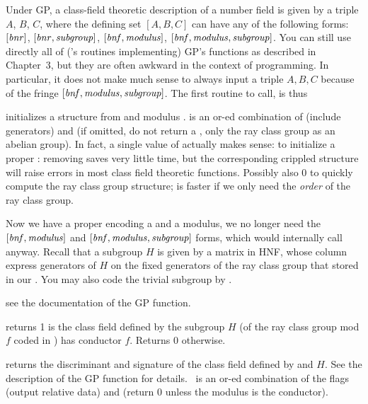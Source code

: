
Under GP, a class-field theoretic description of a number field is given by a
triple $A$, $B$, $C$, where the defining set $[A,B,C]$ can have any of the
following forms: $[\hbox{\it bnr\/}]$, $[\hbox{\it bnr\/},\hbox{\it subgroup\/}]$,
$[\hbox{\it bnf\/},\hbox{\it modulus\/}]$, $[\hbox{\it bnf\/},\hbox{\it modulus\/},\hbox{\it subgroup\/}]$.
You can still use directly all of ('s routines implementing) GP's
functions as described in Chapter~3, but they are often awkward in the context
of  programming. In particular, it does not make much sense to
always input a triple $A,B,C$ because of the fringe
$[\hbox{\it bnf\/},\hbox{\it modulus\/},\hbox{\it subgroup\/}]$. The first routine to call, is
thus

 initializes a 
structure from  and modulus .  is an or-ed
combination of  (include generators) and  (if
omitted, do not return a , only the ray class group as an abelian
group). In fact, a single value of  actually makes sense:
 to initialize a proper : removing
 saves very little time, but the corresponding crippled
 structure will raise errors in most class field theoretic
functions. Possibly also 0 to quickly compute the ray class group structure;
 is faster if we only need the \emph{order} of the ray class
group.

Now we have a proper  encoding a  and a modulus, we no longer
need the $[\hbox{\it bnf\/},\hbox{\it modulus\/}]$ and
$[\hbox{\it bnf\/},\hbox{\it modulus\/},\hbox{\it subgroup\/}]$ forms, which would internally call
 anyway. Recall that a subgroup $H$ is given by a matrix in HNF,
whose column express generators of $H$ on the fixed generators of the ray class
group that stored in our . You may also code the trivial subgroup by
.

 see the documentation of
the GP function.

 returns 1 is the class field
defined by the subgroup $H$ (of the ray class group mod $f$ coded in )
has conductor $f$. Returns 0 otherwise.

 returns the discriminant and
signature of the class field defined by  and $H$. See the description
of the GP function for details. \fl\ is an or-ed combination of the flags
 (output relative data) and  (return 0 unless the
modulus is the conductor).

